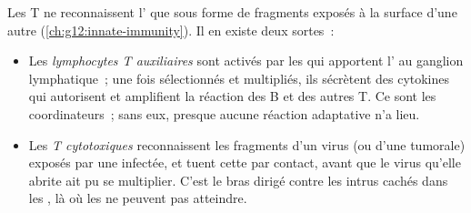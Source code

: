 \begin{proposition}\label{prop:g12:adaptive-immunity:tcells}
Les  T ne reconnaissent l' que sous forme de
fragments exposés à la surface d'une autre 
(\cref{ch:g12:innate-immunity}). Il en existe deux sortes~:
\begin{itemize}
  \item Les \emph{lymphocytes T auxiliaires}
        sont activés par les  qui apportent
        l' au ganglion lymphatique~; une fois sélectionnés et
        multipliés, ils sécrètent des cytokines qui autorisent et
        amplifient la réaction des  B et des autres
         T. Ce sont les coordinateurs~; sans eux, presque
        aucune réaction adaptative n'a lieu.
  \item Les \emph{ T cytotoxiques} reconnaissent les
        fragments d'un virus (ou d'une  tumorale) exposés par
        une  infectée, et tuent cette  par contact,
        avant que le virus qu'elle abrite ait pu se multiplier. C'est
        le bras dirigé contre les intrus cachés dans les , là
        où les  ne peuvent pas atteindre.
\end{itemize}
\end{proposition}
\admitted

